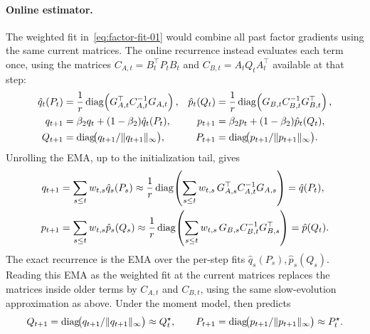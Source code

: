 \paragraph{Online estimator.}
The weighted fit in~\eqref{eq:factor-fit-01} would combine all past
factor gradients using the same current matrices. The online recurrence
instead evaluates each term once, using the matrices
$C_{A,t}=B_t^\top P_tB_t$ and
$C_{B,t}=A_tQ_tA_t^\top$ available at that step:
\begin{equation}\label{eq:ours-klcoupling-01}
\begin{aligned}
  \hat{q}_t(P_t)
    &= \frac1r\operatorname{diag}\!\left(G_{A,t}^\top C_{A,t}^{-1}G_{A,t}\right),
  &
  \hat{p}_t(Q_t)
    &= \frac1r\operatorname{diag}\!\left(G_{B,t}C_{B,t}^{-1}G_{B,t}^\top\right),
  \\
  q_{t+1}
    &= \beta_2q_t+(1-\beta_2)\hat{q}_t(P_t),
  &
  p_{t+1}
    &= \beta_2p_t+(1-\beta_2)\hat{p}_t(Q_t),
  \\
  Q_{t+1}
    &= \operatorname{diag}\!\bigl(q_{t+1}/\| q_{t+1}\|_\infty\bigr),
  &
  P_{t+1}
    &= \operatorname{diag}\!\bigl(p_{t+1}/\| p_{t+1}\|_\infty\bigr).
\end{aligned}
\end{equation}
Unrolling the EMA, up to the initialization tail, gives
\[
\begin{aligned}
  q_{t+1}
  &=
  \sum_{s\le t}w_{t,s}\hat q_s(P_s)
  \approx
  \frac1r\operatorname{diag}\!\left(
    \sum_{s\le t}w_{t,s}\,G_{A,s}^\top C_{A,t}^{-1}G_{A,s}
  \right)
  =
  \hat q(P_t),\\
  p_{t+1}
  &=
  \sum_{s\le t}w_{t,s}\hat p_s(Q_s)
  \approx
  \frac1r\operatorname{diag}\!\left(
    \sum_{s\le t}w_{t,s}\,G_{B,s}C_{B,t}^{-1}G_{B,s}^\top
  \right)
  =
  \hat p(Q_t).
\end{aligned}
\]
The exact recurrence is the EMA over the per-step fits
$\hat q_s(P_s),\hat p_s(Q_s)$. Reading this EMA as the weighted fit at
the current matrices replaces the matrices inside older terms by
$C_{A,t}$ and $C_{B,t}$, using the same slow-evolution approximation as
above. Under the moment model,
 then predicts
\[
  Q_{t+1}
  =
  \operatorname{diag}\!\bigl(q_{t+1}/\| q_{t+1}\|_\infty\bigr)
  \approx Q^\star_t,
  \qquad
  P_{t+1}
  =
  \operatorname{diag}\!\bigl(p_{t+1}/\| p_{t+1}\|_\infty\bigr)
  \approx P^\star_t .
\]

